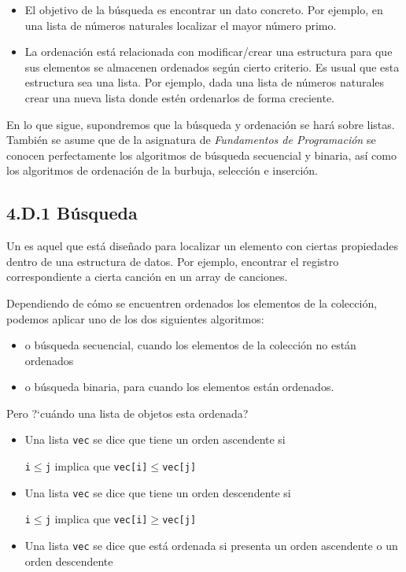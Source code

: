 \begin{itemize}
\item El objetivo de la búsqueda  es encontrar un dato  concreto. Por ejemplo, en una lista de números naturales localizar el mayor número primo.

\item La ordenación está relacionada con modificar/crear una estructura para que sus elementos se almacenen ordenados según cierto criterio. Es usual que esta estructura sea una lista. Por ejemplo, dada una lista de números naturales crear una nueva lista donde estén ordenarlos de forma creciente.
\end{itemize}


\begin{note}
En lo que sigue, supondremos que la búsqueda y ordenación se hará sobre listas.
También se asume que de la asignatura de \textit{Fundamentos de Programación} se conocen perfectamente los algoritmos de búsqueda secuencial y binaria, así como los algoritmos de ordenación de la burbuja, selección e inserción.
\end{note}


\subsection*{4.D.1 Búsqueda}


Un  es aquel que está diseñado para localizar un elemento con ciertas propiedades dentro de una estructura de datos. Por ejemplo, encontrar el registro correspondiente a cierta canción en un array de canciones.

Dependiendo de cómo se encuentren ordenados los elementos de la colección, podemos aplicar uno de los dos siguientes algoritmos: 
\begin{itemize}
\item o búsqueda secuencial, cuando los elementos de la colección no están ordenados
\item o búsqueda binaria, para cuando los elementos están ordenados.
\end{itemize}

\noindent Pero  ?`cuándo una lista de objetos esta ordenada? 
\begin{itemize}
\item Una lista {\tt vec} se dice que tiene un orden ascendente si

\centerline{{\tt i$\leq$j} implica que {\tt vec[i]$\leq$vec[j]}} 

\item Una lista {\tt vec} se dice que tiene un orden descendente si

\centerline{{\tt i$\leq$j} implica que {\tt vec[i]$\geq$vec[j]}}

\item Una lista {\tt vec} se dice que está ordenada si presenta un orden ascendente
o un orden descendente 
\end{itemize}


